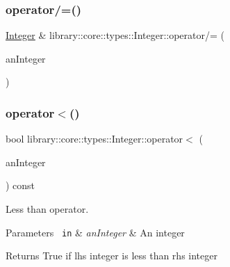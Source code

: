\subsubsection{\texorpdfstring{operator/=()}{operator/=()}\hspace{0.1cm}{\footnotesize\ttfamily [2/2]}}
{\footnotesize\ttfamily \mbox{\hyperlink{classlibrary_1_1core_1_1types_1_1_integer}{Integer}} \& library\+::core\+::types\+::\+Integer\+::operator/= (\begin{DoxyParamCaption}\item[{const \mbox{\hyperlink{classlibrary_1_1core_1_1types_1_1_integer_a623afb1580f870fd8a1997b1c12c917d}{Integer\+::\+Value\+Type}} \&}]{an\+Integer }\end{DoxyParamCaption})}

\mbox{\label{classlibrary_1_1core_1_1types_1_1_integer_a7f179765edbdeb186cde5e869021ccb6}} 
\subsubsection{\texorpdfstring{operator$<$()}{operator<()}\hspace{0.1cm}{\footnotesize\ttfamily [1/2]}}
{\footnotesize\ttfamily bool library\+::core\+::types\+::\+Integer\+::operator$<$ (\begin{DoxyParamCaption}\item[{const \mbox{\hyperlink{classlibrary_1_1core_1_1types_1_1_integer}{Integer}} \&}]{an\+Integer }\end{DoxyParamCaption}) const}



Less than operator. 


\begin{DoxyCode}{0}
\end{DoxyCode}



\begin{DoxyParams}[1]{Parameters}
\mbox{\texttt{ in}}  & {\em an\+Integer} & An integer \\
\hline
\end{DoxyParams}
\begin{DoxyReturn}{Returns}
True if lhs integer is less than rhs integer 
\end{DoxyReturn}
\mbox{\label{classlibrary_1_1core_1_1types_1_1_integer_ad893d193755f414dd680fd867ff30ea0}} 
